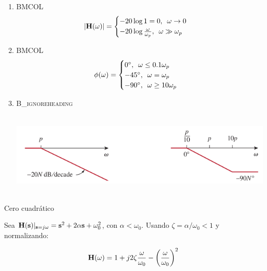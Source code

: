 \begin{enumerate}
\item \hfill{}\textsc{BMCOL}
\label{sec:org9ce6f1c}
\[
  |\mathbf{H}(\omega)| = 
  \begin{cases}
  - 20 \log 1 = 0, \enskip \omega \to 0\\
  - 20 \log \frac{\omega}{\omega_p}, \enskip \omega \gg \omega_p\\
  \end{cases}
\]

\item \hfill{}\textsc{BMCOL}
\label{sec:org1fb87ac}
\[
  \phi(\omega) = 
  \begin{cases}
    \ang{0},\enskip \omega \leq 0.1\omega_p\\
    - \ang{45}, \enskip \omega = \omega_p\\
    - \ang{90}, \enskip \omega \geq 10 \omega_p
  \end{cases}
\]

\item \hfill{}\textsc{B\_ignoreheading}
\label{sec:org46bb3bd}
\begin{center}
\includegraphics[height=4cm]{../figs/BodePoloSimple.pdf}
\end{center}
\end{enumerate}

{Cero cuadrático}

Sea \(\mathbf{H}(\mathbf{s})\rvert_{\mathbf{s} = j\omega}  = \mathbf{s}^2 + 2\alpha \mathbf{s} + \omega_0^2\), con \(\alpha < \omega_0\). Usando \(\zeta = \alpha/\omega_0 < 1\) y normalizando:

\[
  \mathbf{H}(\omega) = 1 + j 2 \zeta \frac{\omega}{\omega_0} - \left(\frac{\omega}{\omega_0}\right)^2 
\]

